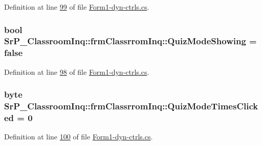 \-Definition at line \hyperlink{_form1-dyn-ctrls_8cs_source_l00099}{99} of file \hyperlink{_form1-dyn-ctrls_8cs_source}{\-Form1-\/dyn-\/ctrls.\-cs}.

\hypertarget{class_sr_p___classroom_inq_1_1frm_classrrom_inq_a2be9d2ea6cc1cabf0dc6c6f3ee2544ce}{
\subsubsection[{\-Quiz\-Mode\-Showing}]{\setlength{\rightskip}{0pt plus 5cm}bool {\bf \-Sr\-P\-\_\-\-Classroom\-Inq\-::frm\-Classrrom\-Inq\-::\-Quiz\-Mode\-Showing} = false}}
\label{class_sr_p___classroom_inq_1_1frm_classrrom_inq_a2be9d2ea6cc1cabf0dc6c6f3ee2544ce}


\-Definition at line \hyperlink{_form1-dyn-ctrls_8cs_source_l00098}{98} of file \hyperlink{_form1-dyn-ctrls_8cs_source}{\-Form1-\/dyn-\/ctrls.\-cs}.

\hypertarget{class_sr_p___classroom_inq_1_1frm_classrrom_inq_a0c88b881dc5ae86b5b3d5e04434b2ea8}{
\subsubsection[{\-Quiz\-Mode\-Times\-Clicked}]{\setlength{\rightskip}{0pt plus 5cm}byte {\bf \-Sr\-P\-\_\-\-Classroom\-Inq\-::frm\-Classrrom\-Inq\-::\-Quiz\-Mode\-Times\-Clicked} = 0}}
\label{class_sr_p___classroom_inq_1_1frm_classrrom_inq_a0c88b881dc5ae86b5b3d5e04434b2ea8}


\-Definition at line \hyperlink{_form1-dyn-ctrls_8cs_source_l00100}{100} of file \hyperlink{_form1-dyn-ctrls_8cs_source}{\-Form1-\/dyn-\/ctrls.\-cs}.

